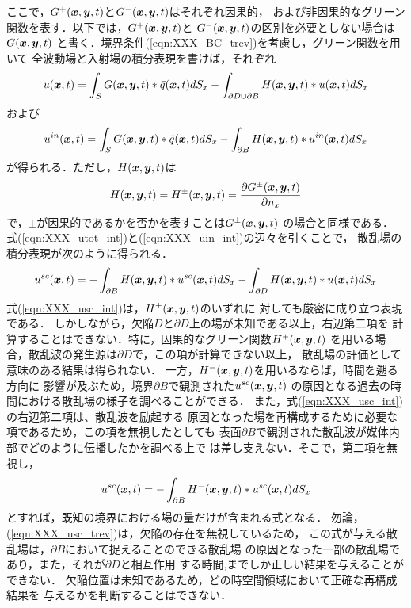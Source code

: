 ここで，$G^+(\mbox{\boldmath $x$},\mbox{\boldmath $y$},t)$と$G^-(\mbox{\boldmath $x$},\mbox{\boldmath $y$},t)$はそれぞれ因果的，
および非因果的なグリーン関数を表す．以下では，$G^+(\mbox{\boldmath $x$},\mbox{\boldmath $y$},t)$と
$G^-(\mbox{\boldmath $x$},\mbox{\boldmath $y$},t)$の区別を必要としない場合は$G(\mbox{\boldmath $x$},\mbox{\boldmath $y$},t)$
と書く．境界条件(\ref{eqn:XXX_BC_trev})を考慮し，グリーン関数を用いて
全波動場と入射場の積分表現を書けば，それぞれ
\begin{equation}
	u(\mbox{\boldmath $x$},t) 
	=
	\int_S G(\mbox{\boldmath $x$},\mbox{\boldmath $y$},t) * \bar{q}(\mbox{\boldmath $x$},t)dS_x 
	-
	\int_{\partial D \cup \partial B} H(\mbox{\boldmath $x$},\mbox{\boldmath $y$},t) * u(\mbox{\boldmath $x$},t)dS_x 
	\label{eqn:XXX_utot_int}
\end{equation}
および
\begin{equation}
	u^{in}(\mbox{\boldmath $x$},t) 
	=
	\int_S G(\mbox{\boldmath $x$},\mbox{\boldmath $y$},t) * \bar{q}(\mbox{\boldmath $x$},t)dS_x 
	-
	\int_{\partial B} H(\mbox{\boldmath $x$},\mbox{\boldmath $y$},t) * u^{in}(\mbox{\boldmath $x$},t)dS_x 
	\label{eqn:XXX_uin_int}
\end{equation}
が得られる．ただし，$H(\mbox{\boldmath $x$},\mbox{\boldmath $y$},t)$は
\begin{equation}
	H(\mbox{\boldmath $x$},\mbox{\boldmath $y$},t)
	=
	H^{\pm}(\mbox{\boldmath $x$},\mbox{\boldmath $y$},t)
	=
	\frac{\partial G^\pm(\mbox{\boldmath $x$},\mbox{\boldmath $y$},t)}{\partial n_x}
	\label{eqn:XXX_def_H}
\end{equation}
で，$\pm$が因果的であるかを否かを表すことは$G^{\pm}(\mbox{\boldmath $x$},\mbox{\boldmath $y$},t)$
の場合と同様である．
式(\ref{eqn:XXX_utot_int})と(\ref{eqn:XXX_uin_int})の辺々を引くことで，
散乱場の積分表現が次のように得られる．
\begin{equation}
	u^{sc}(\mbox{\boldmath $x$},t) 
	=
	-
	\int_{\partial B} H(\mbox{\boldmath $x$},\mbox{\boldmath $y$},t) * u^{sc}(\mbox{\boldmath $x$},t)dS_x 
	-
	\int_{\partial D} H(\mbox{\boldmath $x$},\mbox{\boldmath $y$},t) * u(\mbox{\boldmath $x$},t)dS_x 
	\label{eqn:XXX_usc_int}
\end{equation}
式(\ref{eqn:XXX_usc_int})は，$H^{\pm}(\mbox{\boldmath $x$},\mbox{\boldmath $y$},t)$のいずれに
対しても厳密に成り立つ表現である．
しかしながら，欠陥$D$と$\partial D$上の場が未知である以上，右辺第二項を
計算することはできない．特に，因果的なグリーン関数$H^+(\mbox{\boldmath $x$},\mbox{\boldmath $y$},t)$
を用いる場合，散乱波の発生源は$\partial D$で，この項が計算できない以上，
散乱場の評価として意味のある結果は得られない．
一方，$H^-(\mbox{\boldmath $x$},\mbox{\boldmath $y$},t)$を用いるならば，時間を遡る方向に
影響が及ぶため，境界$\partial B$で観測された$u^{sc}(\mbox{\boldmath $x$},\mbox{\boldmath $y$},t)$
の原因となる過去の時間における散乱場の様子を調べることができる．
また，式(\ref{eqn:XXX_usc_int})の右辺第二項は、散乱波を励起する
原因となった場を再構成するために必要な項であるため，この項を無視したとしても
表面$\partial B$で観測された散乱波が媒体内部でどのように伝播したかを調べる上で
は差し支えない．そこで，第二項を無視し，
\begin{equation}
	u^{sc}(\mbox{\boldmath $x$},t) 
	=
	-
	\int_{\partial B} H^-(\mbox{\boldmath $x$},\mbox{\boldmath $y$},t) * u^{sc}(\mbox{\boldmath $x$},t)dS_x 
	\label{eqn:XXX_usc_trev}
\end{equation}
とすれば，既知の境界における場の量だけが含まれる式となる．
勿論，(\ref{eqn:XXX_usc_trev})は，欠陥の存在を無視しているため，
この式が与える散乱場は，$\partial B$において捉えることのできる散乱場
の原因となった一部の散乱場であり，また，それが$\partial D$と相互作用
する時間,までしか正しい結果を与えることができない．
欠陥位置は未知であるため，どの時空間領域において正確な再構成結果を
与えるかを判断することはできない．

